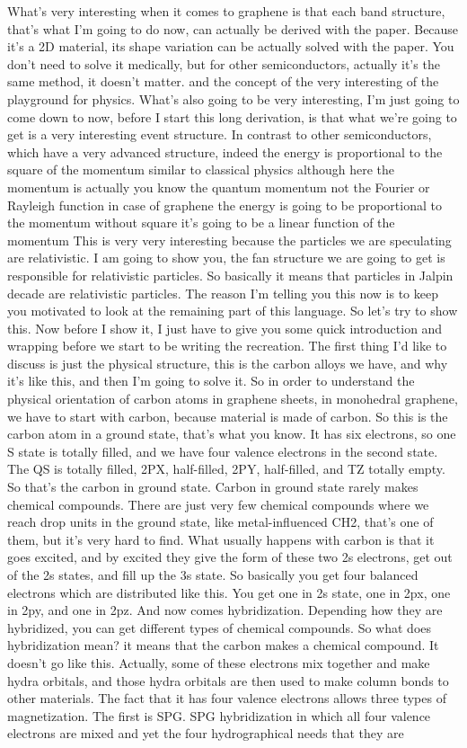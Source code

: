 What's very interesting when it comes to graphene is that each band structure, that's what I'm going to do now, can actually be derived with the paper. Because it's a 2D material, its shape variation can be actually solved with the paper. You don't need to solve it medically, but for other semiconductors, actually it's the same method, it doesn't matter. and the concept of the very interesting of the playground for physics. What's also going to be very interesting, I'm just going to come down to now, before I start this long derivation, is that what we're going to get is a very interesting event structure. In contrast to other semiconductors, which have a very advanced structure, indeed the energy is proportional to the square of the momentum similar to classical physics although here the momentum is actually you know the quantum momentum not the Fourier or Rayleigh function in case of graphene the energy is going to be proportional to the momentum without square it's going to be a linear function of the momentum This is very very interesting because the particles we are speculating are relativistic. I am going to show you, the fan structure we are going to get is responsible for relativistic particles. So basically it means that particles in Jalpin decade are relativistic particles. The reason I'm telling you this now is to keep you motivated to look at the remaining part of this language. So let's try to show this. Now before I show it, I just have to give you some quick introduction and wrapping before we start to be writing the recreation. The first thing I'd like to discuss is just the physical structure, this is the carbon alloys we have, and why it's like this, and then I'm going to solve it. So in order to understand the physical orientation of carbon atoms in graphene sheets, in monohedral graphene, we have to start with carbon, because material is made of carbon. So this is the carbon atom in a ground state, that's what you know. It has six electrons, so one S state is totally filled, and we have four valence electrons in the second state. The QS is totally filled, 2PX, half-filled, 2PY, half-filled, and TZ totally empty. So that's the carbon in ground state. Carbon in ground state rarely makes chemical compounds. There are just very few chemical compounds where we reach drop units in the ground state, like metal-influenced CH2, that's one of them, but it's very hard to find. What usually happens with carbon is that it goes excited, and by excited they give the form of these two 2s electrons, get out of the 2s states, and fill up the 3s state. So basically you get four balanced electrons which are distributed like this. You get one in 2s state, one in 2px, one in 2py, and one in 2pz. And now comes hybridization. Depending how they are hybridized, you can get different types of chemical compounds. So what does hybridization mean? it means that the carbon makes a chemical compound. It doesn't go like this. Actually, some of these electrons mix together and make hydra orbitals, and those hydra orbitals are then used to make column bonds to other materials. The fact that it has four valence electrons allows three types of magnetization. The first is SPG. SPG hybridization in which all four valence electrons are mixed and yet the four hydrographical needs that they are 